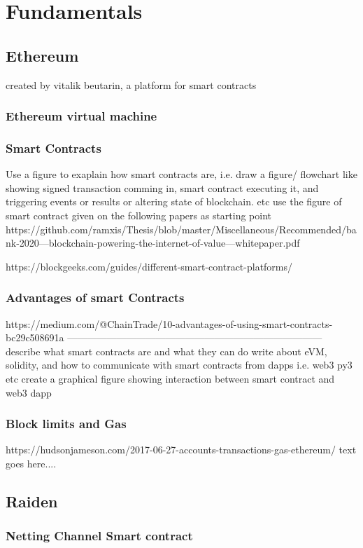\section{Fundamentals}
\subsection{Ethereum}
created by vitalik beutarin, a platform for smart contracts
\subsubsection{Ethereum virtual machine}
\subsubsection{Smart Contracts}
Use a figure to exaplain how smart contracts are, i.e. draw a figure/ flowchart like showing signed transaction comming in, smart contract executing it, and triggering events or results or altering state of blockchain. etc
use the figure of smart contract given on the following papers as starting point
https://github.com/ramxis/Thesis/blob/master/Miscellaneous/Recommended/bank-2020---blockchain-powering-the-internet-of-value---whitepaper.pdf

https://blockgeeks.com/guides/different-smart-contract-platforms/

\subsubsection{Advantages of smart Contracts}
https://medium.com/@ChainTrade/10-advantages-of-using-smart-contracts-bc29c508691a
------------------------------------------------------------------------------
describe what smart contracts are and what they can do
write about eVM, solidity, and how to communicate with smart contracts from dapps i.e. web3 py3 etc
create a graphical figure showing interaction between smart contract and web3 dapp
\subsubsection{Block limits and Gas}
https://hudsonjameson.com/2017-06-27-accounts-transactions-gas-ethereum/
text goes here....
\subsection{Raiden}
\subsubsection{Netting Channel Smart contract}
